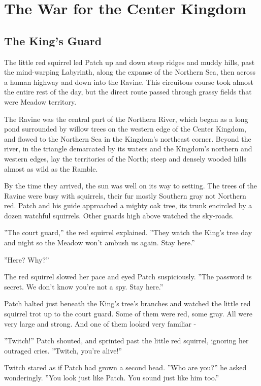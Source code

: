 \documentclass[12pt]{book}
\begin{document}

\chapter{The War for the Center Kingdom}

\section{The King's Guard}

The little red squirrel led Patch up and down steep ridges and muddy hills, past the mind-warping Labyrinth, along the expanse of the Northern Sea, then across a human highway and down into the Ravine. This circuitous course took almost the entire rest of the day, but the direct route passed through grassy fields that were Meadow territory.

The Ravine was the central part of the Northern River, which began as a long pond surrounded by willow trees on the western edge of the Center Kingdom, and flowed to the Northern Sea in the Kingdom's northeast corner. Beyond the river, in the triangle demarcated by its waters and the Kingdom's northern and western edges, lay the territories of the North; steep and densely wooded hills almost as wild as the Ramble.

By the time they arrived, the sun was well on its way to setting. The trees of the Ravine were busy with squirrels, their fur mostly Southern gray not Northern red. Patch and his guide approached a mighty oak tree, its trunk encircled by a dozen watchful squirrels. Other guards high above watched the sky-roads.

''The court guard,'' the red squirrel explained. ''They watch the King's tree day and night so the Meadow won't ambush us again. Stay here.''

''Here? Why?''

The red squirrel slowed her pace and eyed Patch suspiciously. ''The password is secret. We don't know you're not a spy. Stay here.''

Patch halted just beneath the King's tree's branches and watched the little red squirrel trot up to the court guard. Some of them were red, some gray. All were very large and strong. And one of them looked very familiar -

''Twitch!'' Patch shouted, and sprinted past the little red squirrel, ignoring her outraged cries. ''Twitch, you're alive!''

Twitch stared as if Patch had grown a second head. ''Who are you?'' he asked wonderingly. ''You look just like Patch. You sound just like him too.''
\end{document}

